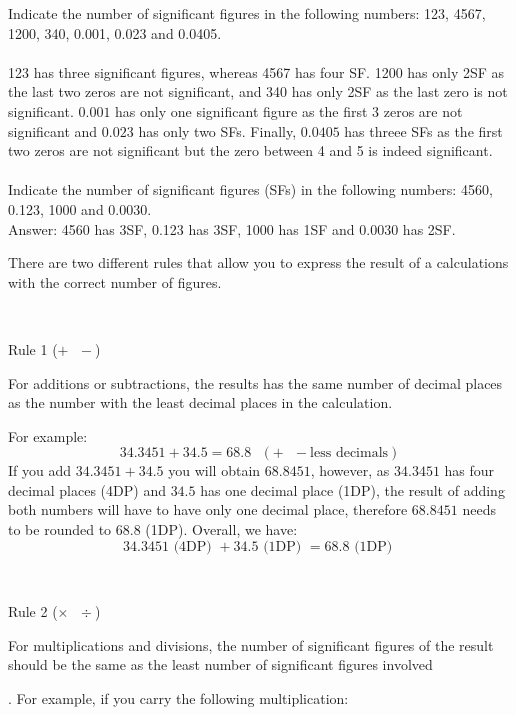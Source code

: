 \documentclass[main.tex]{subfiles}
\begin{document}
\begin{description}
\begin{example} %
Indicate the number of significant figures in the following numbers: 123, 4567, 1200, 340, 0.001, 0.023 and 0.0405.
\\
\\
123 has three significant figures, whereas 4567 has four SF. 1200 has only 2SF as the last two zeros are not significant, and 340 has only 2SF as the last zero is not significant. $0.001$ has only one significant figure as the first 3 zeros are not significant and $0.023$ has only two SFs. Finally, $0.0405$ has threee SFs as the first two zeros are not significant but the zero between 4 and 5 is indeed significant.\\
\faDiamond\ \\
Indicate the number of significant figures (SFs) in the following numbers: 4560, 0.123, 1000 and 0.0030. \\
\flushright Answer: 4560 has 3SF, 0.123 has 3SF, 1000 has 1SF and 0.0030 has 2SF.
\end{example}%

\item[\docfilehook{Significant figures in calculations}{Significant figures in calculations}] There are two different rules that allow you to express the result of a calculations with the correct number of figures.

 \faCodeFork\ \begin{bf}Rule 1 ($+\text{ }-$)\end{bf}  \begin{it} For additions or subtractions, the results has the same number of decimal places as the number with the least decimal places in the calculation.\end{it} For example:
\[34.3451+34.5=68.8 \text{ }(+\text{ }- \text{less decimals})\]
If you add $34.3451+34.5$ you will obtain $68.8451$, however, as $34.3451$ has four decimal places (4DP) and $34.5$ has one decimal place (1DP), the result of adding both numbers will have to have only one decimal place, therefore $68.8451$ needs to be rounded to $68.8$ (1DP). Overall, we have:
\[34.3451\text{ (4DP) }+34.5\text{ (1DP) }=68.8 \text{ (1DP) }\]

 \faCodeFork\ \begin{bf}Rule 2 ($\times\text{ }\div$)\end{bf}  \begin{it} For multiplications and divisions, the number of significant figures of the result should be the same as the least number of significant figures involved\end{it}. For example, if you carry the following multiplication:


\end{description}
\end{document}
